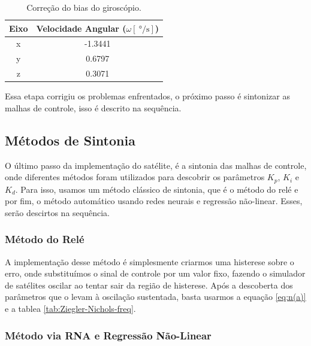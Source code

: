 \begin{table}[H]
  \caption{Correção do bias do giroscópio.}
  \label{tab:bias_correction}
  \centering%
  \begin{minipage}{.42\textwidth}
    \begin{tabular*}{\textwidth}{cc}
      \hline
      {Eixo} & Velocidade Angular ($\omega [\SI{}{\degree\per\second}]$)\\ \hline
      \hline
      x  &  -1.3441 \\ 
      y  &  0.6797 \\
      z  &  0.3071 \\ \hline
    \end{tabular*}
  \end{minipage}
\end{table}

Essa etapa corrigiu os problemas enfrentados, o próximo passo é sintonizar as malhas de controle, isso é descrito na sequência.



\subsection{Métodos de Sintonia}

O último passo da implementação do satélite, é a sintonia das malhas de controle, onde diferentes métodos foram utilizados para descobrir os parâmetros \textit{$K_p$}, \textit{$K_i$} e \textit{$K_d$}. Para isso, usamos um método clássico de sintonia, que é o método do relé e por fim, o método automático usando redes neurais e regressão não-linear. Esses, serão descirtos na sequência. 



\subsubsection{Método do Relé}

A implementação desse método é simplesmente criarmos uma histerese sobre o erro, onde substituímos o sinal de controle por um valor fixo, fazendo o simulador de satélites oscilar ao tentar sair da região de histerese. Após a descoberta dos parâmetros que o levam  à oscilação sustentada, basta usarmos a equação \ref{eq:n(a)} e a tablea \ref{tab:Ziegler-Nichols-freq}.



\subsubsection{Método via RNA e Regressão Não-Linear}

